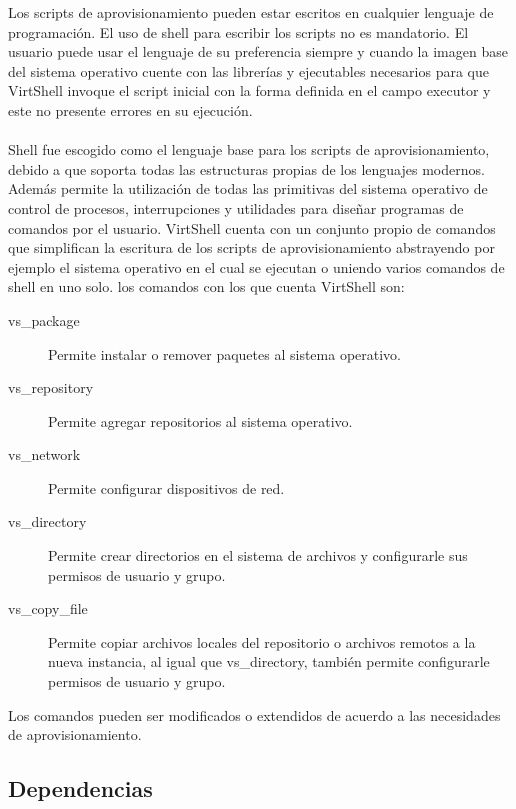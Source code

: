 \vspace{5mm}

Los scripts de aprovisionamiento pueden estar escritos en cualquier lenguaje de programación. El uso de shell para escribir los scripts no es mandatorio. El usuario puede usar el lenguaje de su preferencia siempre y cuando la imagen base del sistema operativo cuente con las librerías y ejecutables necesarios para que VirtShell invoque el script inicial con la forma definida en el campo executor y este no presente errores en su ejecución.\\
\\
Shell fue escogido como el lenguaje base para los scripts de aprovisionamiento, debido a que soporta todas las estructuras propias de los lenguajes modernos. Además permite la utilización de todas las primitivas del sistema operativo de control de procesos, interrupciones y utilidades para diseñar programas de comandos por el usuario. VirtShell cuenta con un conjunto propio de comandos que simplifican la escritura de los scripts de aprovisionamiento abstrayendo por ejemplo el sistema operativo en el cual se ejecutan o uniendo varios comandos de shell en uno solo. los comandos con los que cuenta VirtShell son:

\vspace{3mm}

\begin{description}
\item [vs\_package] Permite instalar o remover paquetes al sistema operativo.
\item [vs\_repository] Permite agregar repositorios al sistema operativo.
\item [vs\_network] Permite configurar dispositivos de red.
\item [vs\_directory] Permite crear directorios en el sistema de archivos y configurarle sus permisos de usuario y grupo.
\item [vs\_copy\_file] Permite copiar archivos locales del repositorio o archivos remotos a la nueva instancia, al igual que vs\_directory, también permite configurarle permisos de usuario y grupo.
\end{description}

\vspace{3mm}

Los comandos pueden ser modificados o extendidos de acuerdo a las necesidades de aprovisionamiento.

\subsection{Dependencias}


